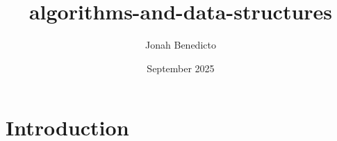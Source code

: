 \documentclass{book}
\title{algorithms-and-data-structures}
\author{Jonah Benedicto}
\date{September 2025}
\begin{document}
\maketitle

\section*{Introduction}
\end{document}
